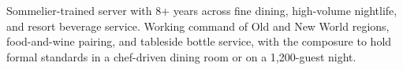 \documentclass[10pt, letterpaper]{awesome-cv}
\begin{document}
\makecvheader[C]


\par
\begin{cvparagraph}
Sommelier-trained server with 8+ years across fine dining, high-volume nightlife, and resort beverage
service. Working command of Old and New World regions, food-and-wine pairing, and tableside bottle
service, with the composure to hold formal standards in a chef-driven dining room or on a
1{,}200-guest night.
\end{cvparagraph}


\end{document}
